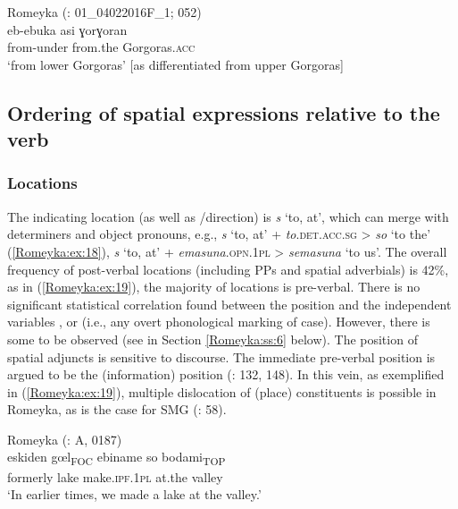 \documentclass[output=paper,colorlinks,citecolor=brown]{langscibook}
\begin{document}
\ea\label{Romeyka:ex:17}
Romeyka (\citealt{schreiber_inprep}: 01\_04022016F\_1; 052) \\
\gll eb-ebuka asi ɣorɣoran \\
from-under from.the Gorgoras\textsc{.acc} \\
\glt `from lower Gorgoras' [as differentiated from upper Gorgoras]  \\
\z

\subsection{Ordering of spatial expressions relative to the verb}\label{Romeyka:ss:4.3}

\subsubsection{Locations}\label{Romeyka:ss:4.3.1}

The  indicating location (as well as /direction) is \textit{s} `to, at', which can merge with determiners and object pronouns, e.g., \textit{s }`to, at' + \textit{to}\textsc{.det.acc.sg} > \textit{so} `to the' (\ref{Romeyka:ex:18}), \textit{s }`to, at' + \textit{emasuna}\textsc{.opn.1pl} > \textit{semasuna} `to us'. The overall frequency of post-verbal locations (including PPs and spatial adverbials) is 42\%, as in (\ref{Romeyka:ex:19}), the majority of locations is pre-verbal. There is no significant statistical correlation found between the position and the independent variables ,  or  (i.e., any overt phonological marking of case). However, there is some  to be observed (see  in Section \ref{Romeyka:ss:6} below). The position of spatial adjuncts is sensitive to discourse. The immediate pre-verbal position is argued to be the (information)  position (\citealt{neocleous_word_2020}: 132, 148). In this vein, as exemplified in (\ref{Romeyka:ex:19}), multiple dislocation of (place) constituents is possible in Romeyka, as is the case for SMG (\citealt{alexiadou1997Adverb}: 58).

\ea\label{Romeyka:ex:18} 	
Romeyka (\citealt{schreiber2021pontic}: A, 0187) \\
\gll eskiden gœl\textsubscript{FOC} ebiname so bodami\textsubscript{TOP} \\
formerly lake make\textsc{.ipf.1pl} at.the valley \\
\glt `In earlier times, we made a lake at the valley.'
\z
\end{document}
